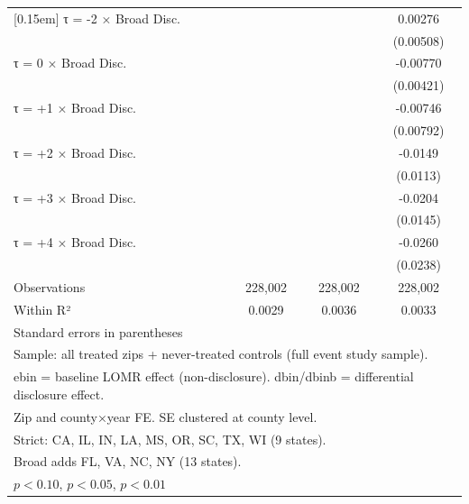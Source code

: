 \begin{table}[htbp]
\begin{tabular}{l*{3}{c}}
[0.15em]
τ = -2 × Broad Disc.&                     &                     &     0.00276         \\
                    &                     &                     &   (0.00508)         \\
[0.15em]
τ = 0 × Broad Disc. &                     &                     &    -0.00770\sym{*}  \\
                    &                     &                     &   (0.00421)         \\
[0.15em]
τ = +1 × Broad Disc.&                     &                     &    -0.00746         \\
                    &                     &                     &   (0.00792)         \\
[0.15em]
τ = +2 × Broad Disc.&                     &                     &     -0.0149         \\
                    &                     &                     &    (0.0113)         \\
[0.15em]
τ = +3 × Broad Disc.&                     &                     &     -0.0204         \\
                    &                     &                     &    (0.0145)         \\
[0.15em]
τ = +4 × Broad Disc.&                     &                     &     -0.0260         \\
                    &                     &                     &    (0.0238)         \\
\hline
Observations        &     228,002         &     228,002         &     228,002         \\
Within R²           &      0.0029         &      0.0036         &      0.0033         \\
\hline\hline
\multicolumn{4}{l}{\footnotesize Standard errors in parentheses}\\
\multicolumn{4}{l}{\footnotesize Sample: all treated zips + never-treated controls (full event study sample).}\\
\multicolumn{4}{l}{\footnotesize ebin = baseline LOMR effect (non-disclosure). dbin/dbinb = differential disclosure effect.}\\
\multicolumn{4}{l}{\footnotesize Zip and county×year FE. SE clustered at county level.}\\
\multicolumn{4}{l}{\footnotesize Strict: CA, IL, IN, LA, MS, OR, SC, TX, WI (9 states).}\\
\multicolumn{4}{l}{\footnotesize Broad adds FL, VA, NC, NY (13 states).}\\
\multicolumn{4}{l}{\footnotesize \sym{*} \(p<0.10\), \sym{**} \(p<0.05\), \sym{***} \(p<0.01\)}\\
\end{tabular}
\end{table}
